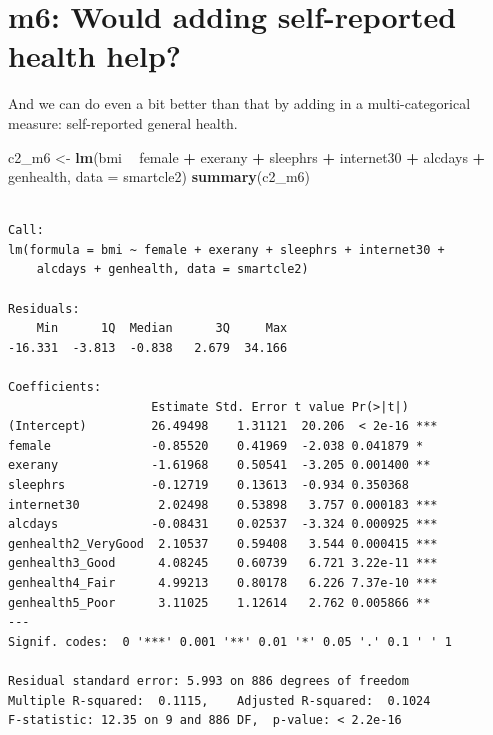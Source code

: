 \documentclass[]{book}
\newenvironment{Shaded}{\begin{snugshade}}{\end{snugshade}}
\newcommand{\KeywordTok}[1]{\textcolor[rgb]{0.13,0.29,0.53}{\textbf{#1}}}
\newcommand{\DataTypeTok}[1]{\textcolor[rgb]{0.13,0.29,0.53}{#1}}
\newcommand{\StringTok}[1]{\textcolor[rgb]{0.31,0.60,0.02}{#1}}
\newcommand{\OperatorTok}[1]{\textcolor[rgb]{0.81,0.36,0.00}{\textbf{#1}}}
\newcommand{\NormalTok}[1]{#1}
\theoremstyle{definition}
\theoremstyle{definition}
\theoremstyle{definition}
\theoremstyle{remark}
\begin{document}
\section{m6: Would adding self-reported health
help?}\label{m6-would-adding-self-reported-health-help}

And we can do even a bit better than that by adding in a
multi-categorical measure: self-reported general health.

\begin{Shaded}
\begin{Highlighting}[]
\NormalTok{c2_m6 <-}\StringTok{ }\KeywordTok{lm}\NormalTok{(bmi }\OperatorTok{~}\StringTok{ }\NormalTok{female }\OperatorTok{+}\StringTok{ }\NormalTok{exerany }\OperatorTok{+}\StringTok{ }\NormalTok{sleephrs }\OperatorTok{+}\StringTok{ }\NormalTok{internet30 }\OperatorTok{+}\StringTok{ }\NormalTok{alcdays }\OperatorTok{+}\StringTok{ }\NormalTok{genhealth,}
         \DataTypeTok{data =}\NormalTok{ smartcle2)}
\KeywordTok{summary}\NormalTok{(c2_m6)}
\end{Highlighting}
\end{Shaded}

\begin{verbatim}

Call:
lm(formula = bmi ~ female + exerany + sleephrs + internet30 + 
    alcdays + genhealth, data = smartcle2)

Residuals:
    Min      1Q  Median      3Q     Max 
-16.331  -3.813  -0.838   2.679  34.166 

Coefficients:
                    Estimate Std. Error t value Pr(>|t|)    
(Intercept)         26.49498    1.31121  20.206  < 2e-16 ***
female              -0.85520    0.41969  -2.038 0.041879 *  
exerany             -1.61968    0.50541  -3.205 0.001400 ** 
sleephrs            -0.12719    0.13613  -0.934 0.350368    
internet30           2.02498    0.53898   3.757 0.000183 ***
alcdays             -0.08431    0.02537  -3.324 0.000925 ***
genhealth2_VeryGood  2.10537    0.59408   3.544 0.000415 ***
genhealth3_Good      4.08245    0.60739   6.721 3.22e-11 ***
genhealth4_Fair      4.99213    0.80178   6.226 7.37e-10 ***
genhealth5_Poor      3.11025    1.12614   2.762 0.005866 ** 
---
Signif. codes:  0 '***' 0.001 '**' 0.01 '*' 0.05 '.' 0.1 ' ' 1

Residual standard error: 5.993 on 886 degrees of freedom
Multiple R-squared:  0.1115,    Adjusted R-squared:  0.1024 
F-statistic: 12.35 on 9 and 886 DF,  p-value: < 2.2e-16
\end{verbatim}
\end{document}
